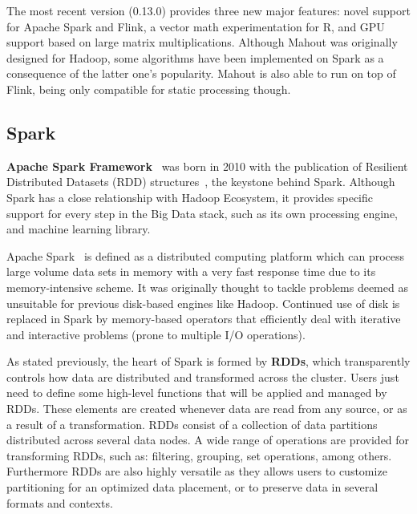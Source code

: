 \documentclass[3p,review]{elsarticle}
\begin{document}
	The most recent version (0.13.0) provides three new major features: novel support for Apache Spark and Flink, a vector math experimentation for R, and GPU support based on large matrix multiplications. Although Mahout was originally designed for Hadoop, some algorithms have been implemented on Spark as a consequence of the latter one's popularity. Mahout is also able to run on top of Flink, being only compatible for static processing though.
	
	\subsection{Spark}\label{subsec:spark}
	
	
	
	\textbf{Apache Spark Framework}~\cite{spark} was born in 2010 with the publication of Resilient Distributed Datasets (RDD) structures~\cite{zaharia12}, the keystone behind Spark. Although Spark has a close relationship with Hadoop Ecosystem, it provides specific support for every step in the Big Data stack, such as its own processing engine, and machine learning library. 
	
	Apache Spark~\cite{hamstra15} is defined as a distributed computing platform which can process large volume data sets in memory with a very fast response time due to its memory-intensive scheme. It was originally thought to tackle problems deemed as unsuitable for previous disk-based engines like Hadoop. Continued use of disk is replaced in Spark by memory-based operators that efficiently deal with iterative and interactive problems (prone to multiple I/O operations). 
	
	As stated previously, the heart of Spark is formed by \textbf{RDDs}, which transparently controls how data are distributed and transformed across the cluster. Users just need to define some high-level functions that will be applied and managed by RDDs. These elements are created whenever data are read from any source, or as a result of a transformation. RDDs consist of a collection of data partitions distributed across several data nodes. A wide range of operations are provided for transforming RDDs, such as: filtering, grouping, set operations, among others. Furthermore RDDs are also highly versatile as they allows users to customize partitioning for an optimized data placement, or to preserve data in several formats and contexts.
	
\end{document}
